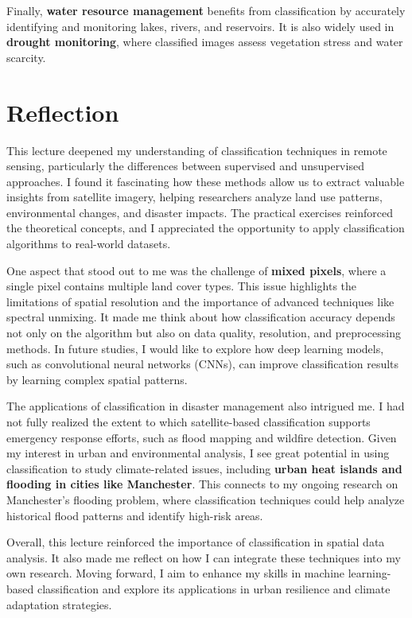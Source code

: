 \documentclass[
  letterpaper,
]{scrbook}
\begin{document}
Finally, \textbf{water resource management} benefits from classification
by accurately identifying and monitoring lakes, rivers, and reservoirs.
It is also widely used in \textbf{drought monitoring}, where classified
images assess vegetation stress and water scarcity.

\section{Reflection}\label{reflection-4}

This lecture deepened my understanding of classification techniques in
remote sensing, particularly the differences between supervised and
unsupervised approaches. I found it fascinating how these methods allow
us to extract valuable insights from satellite imagery, helping
researchers analyze land use patterns, environmental changes, and
disaster impacts. The practical exercises reinforced the theoretical
concepts, and I appreciated the opportunity to apply classification
algorithms to real-world datasets.

One aspect that stood out to me was the challenge of \textbf{mixed
pixels}, where a single pixel contains multiple land cover types. This
issue highlights the limitations of spatial resolution and the
importance of advanced techniques like spectral unmixing. It made me
think about how classification accuracy depends not only on the
algorithm but also on data quality, resolution, and preprocessing
methods. In future studies, I would like to explore how deep learning
models, such as convolutional neural networks (CNNs), can improve
classification results by learning complex spatial patterns.

The applications of classification in disaster management also intrigued
me. I had not fully realized the extent to which satellite-based
classification supports emergency response efforts, such as flood
mapping and wildfire detection. Given my interest in urban and
environmental analysis, I see great potential in using classification to
study climate-related issues, including \textbf{urban heat islands and
flooding in cities like Manchester}. This connects to my ongoing
research on Manchester's flooding problem, where classification
techniques could help analyze historical flood patterns and identify
high-risk areas.

Overall, this lecture reinforced the importance of classification in
spatial data analysis. It also made me reflect on how I can integrate
these techniques into my own research. Moving forward, I aim to enhance
my skills in machine learning-based classification and explore its
applications in urban resilience and climate adaptation strategies.
\end{document}

